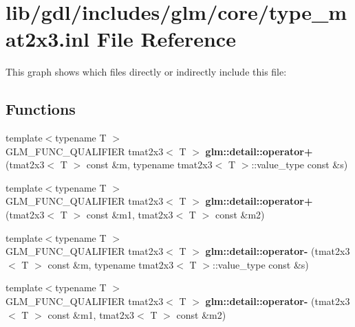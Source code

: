\hypertarget{type__mat2x3_8inl}{}\section{lib/gdl/includes/glm/core/type\+\_\+mat2x3.inl File Reference}
\label{type__mat2x3_8inl}
This graph shows which files directly or indirectly include this file\+:
\subsection*{Functions}
\begin{DoxyCompactItemize}
\item 
\hypertarget{namespaceglm_1_1detail_a64384ac6e361d06263b559da9a0198d2}{}{\footnotesize template$<$typename T $>$ }\\G\+L\+M\+\_\+\+F\+U\+N\+C\+\_\+\+Q\+U\+A\+L\+I\+F\+I\+E\+R tmat2x3$<$ T $>$ {\bfseries glm\+::detail\+::operator+} (tmat2x3$<$ T $>$ const \&m, typename tmat2x3$<$ T $>$\+::value\+\_\+type const \&s)\label{namespaceglm_1_1detail_a64384ac6e361d06263b559da9a0198d2}

\item 
\hypertarget{namespaceglm_1_1detail_a75ffbdb3efd2991c406debd80bdcd77e}{}{\footnotesize template$<$typename T $>$ }\\G\+L\+M\+\_\+\+F\+U\+N\+C\+\_\+\+Q\+U\+A\+L\+I\+F\+I\+E\+R tmat2x3$<$ T $>$ {\bfseries glm\+::detail\+::operator+} (tmat2x3$<$ T $>$ const \&m1, tmat2x3$<$ T $>$ const \&m2)\label{namespaceglm_1_1detail_a75ffbdb3efd2991c406debd80bdcd77e}

\item 
\hypertarget{namespaceglm_1_1detail_ae2b907884e410f8a90523508f46eca76}{}{\footnotesize template$<$typename T $>$ }\\G\+L\+M\+\_\+\+F\+U\+N\+C\+\_\+\+Q\+U\+A\+L\+I\+F\+I\+E\+R tmat2x3$<$ T $>$ {\bfseries glm\+::detail\+::operator-\/} (tmat2x3$<$ T $>$ const \&m, typename tmat2x3$<$ T $>$\+::value\+\_\+type const \&s)\label{namespaceglm_1_1detail_ae2b907884e410f8a90523508f46eca76}

\item 
\hypertarget{namespaceglm_1_1detail_a756bdeeaa7ef14e6de45eea915bf16b2}{}{\footnotesize template$<$typename T $>$ }\\G\+L\+M\+\_\+\+F\+U\+N\+C\+\_\+\+Q\+U\+A\+L\+I\+F\+I\+E\+R tmat2x3$<$ T $>$ {\bfseries glm\+::detail\+::operator-\/} (tmat2x3$<$ T $>$ const \&m1, tmat2x3$<$ T $>$ const \&m2)\label{namespaceglm_1_1detail_a756bdeeaa7ef14e6de45eea915bf16b2}


\end{DoxyCompactItemize}
